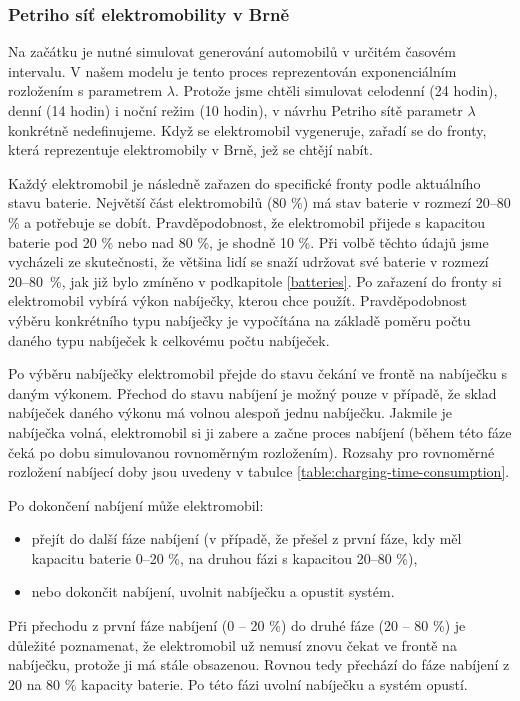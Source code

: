\documentclass[a4paper,11pt]{article}
\begin{document}
\subsubsection{Petriho síť elektromobility v Brně}

Na začátku je nutné simulovat generování automobilů v určitém časovém intervalu. V našem modelu je tento proces reprezentován exponenciálním rozložením s parametrem \(\lambda\). Protože jsme chtěli simulovat celodenní (24 hodin), denní (14 hodin) i noční režim (10 hodin), v návrhu Petriho sítě parametr \(\lambda\) konkrétně nedefinujeme. Když se elektromobil vygeneruje, zařadí se do fronty, která reprezentuje elektromobily v Brně, jež se chtějí nabít. 

Každý elektromobil je následně zařazen do specifické fronty podle aktuálního stavu baterie. Největší část elektromobilů (80 \%) má stav baterie v rozmezí 20–80 \% a potřebuje se dobít. Pravděpodobnost, že elektromobil přijede s kapacitou baterie pod 20 \% nebo nad 80 \%, je shodně 10 \%. Při volbě těchto údajů jsme vycházeli ze skutečnosti, že většina lidí se snaží udržovat své baterie v rozmezí 20–80~\%, jak již bylo zmíněno v podkapitole \ref{batteries}. Po zařazení do fronty si elektromobil vybírá výkon nabíječky, kterou chce použít. Pravděpodobnost výběru konkrétního typu nabíječky je vypočítána na základě poměru počtu daného typu nabíječek k celkovému počtu nabíječek. 

Po výběru nabíječky elektromobil přejde do stavu čekání ve frontě na nabíječku s daným výkonem. Přechod do stavu nabíjení je možný pouze v případě, že sklad nabíječek daného výkonu má volnou alespoň jednu nabíječku. Jakmile je nabíječka volná, elektromobil si ji zabere a začne proces nabíjení (během této fáze čeká po dobu simulovanou rovnoměrným rozložením). Rozsahy pro rovnoměrné rozložení nabíjecí doby jsou uvedeny v tabulce \ref{table:charging-time-consumption}.


Po dokončení nabíjení může elektromobil:
\begin{itemize}
    \item přejít do další fáze nabíjení (v případě, že přešel z první fáze, kdy měl kapacitu baterie 0–20 \%, na druhou fázi s kapacitou 20–80 \%),
    \item nebo dokončit nabíjení, uvolnit nabíječku a opustit systém.
\end{itemize}

Při přechodu z první fáze nabíjení (0 -- 20 \%) do druhé fáze (20 -- 80 \%) je důležité poznamenat, že elektromobil už nemusí znovu čekat ve frontě na nabíječku, protože ji má stále obsazenou. Rovnou tedy přechází do fáze nabíjení z 20 na 80 \% kapacity baterie. Po této fázi uvolní nabíječku a systém opustí.
\end{document}
